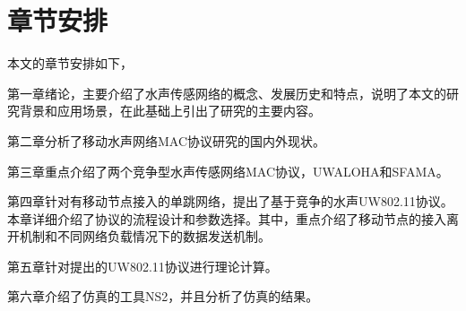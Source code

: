 \section{章节安排}
本文的章节安排如下，

第一章绪论，主要介绍了水声传感网络的概念、发展历史和特点，说明了本文的研究背景和应用场景，在此基础上引出了研究的主要内容。

第二章分析了移动水声网络MAC协议研究的国内外现状。

第三章重点介绍了两个竞争型水声传感网络MAC协议，UWALOHA和SFAMA。

第四章针对有移动节点接入的单跳网络，提出了基于竞争的水声UW802.11协议。本章详细介绍了协议的流程设计和参数选择。其中，重点介绍了移动节点的接入离开机制和不同网络负载情况下的数据发送机制。

第五章针对提出的UW802.11协议进行理论计算。

第六章介绍了仿真的工具NS2，并且分析了仿真的结果。

\endinput